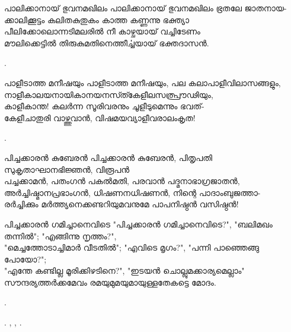 \begin{enumerate}


\begin{slokam}{\VMk}{\KV}{പാലിക്കാനായ് ഭുവനമഖിലം}
പാലിക്കാനായ് ഭുവനമഖിലം ഭ്രതലേ ജാതനായ-\\
ക്കാലിക്കൂട്ടം കലിതകുതുകം കാത്ത കണ്ണന്നു ഭക്ത്യാ\\
പീലിക്കോലൊന്നടിമലരിൽ നീ കാഴ്ചയായ് വച്ചിടേണം\\
മൗലിക്കെട്ടിൽ തിരുകുമതിനെത്തീൎച്ചയായ് ഭക്തദാസൻ.
\end{slokam}


.



\begin{slokam}{\VSv}{\KJ}{പാളീടാത്ത മനീഷയും}
പാളീടാത്ത മനീഷയും, പല കലാപാളീവിലാസങ്ങളും, \\
നാളീകാലയനായികാനയനസ്ത്കേളീലസത്പ്രൗഢിയും, \\
കാളീകാന്ത! കലർന്ന സൂരിവരനും ചൂളീടുമെന്നും ഭവത്- \\
കേളീചാതുരി വാഴ്ത്തുവാൻ, വിഷമയവ്യാളീവരാലംകൃത!
\end{slokam}


. 


\begin{slokam}{\VSr}{\OKM}{പിച്ചക്കാരൻ കുബേരൻ}
പിച്ചക്കാരൻ കുബേരൻ, പിതൃപതി സുകൃതാഘാനഭിജ്ഞൻ, വിരൂപൻ\\
പച്ചക്കാമൻ, പതംഗൻ പകൽമതി, പരവാൻ പദ്മനാഭാഗ്രജാതൻ,\\
അർച്ചിഷ്മാനപ്രഭാംഗൻ, ധിഷണനധിഷണൻ, നിന്റെ പാദാംബുജത്താ-\\
രർച്ചിക്കും മർത്ത്യനെക്കണ്ടറിയുമവനുമേ പാപനിഷ്ഠൻ വസിഷ്ഠൻ!
\end{slokam}



\begin{slokam}{\VSr}{\ARRV}{പിച്ചക്കാരൻ ഗമിച്ചാനെവിടെ}
"പിച്ചക്കാരൻ ഗമിച്ചാനെവിടെ?", "ബലിമഖം തന്നിൽ"; "എങ്ങിന്നു നൃത്തം?",\\
"മെച്ചത്തോടാച്ചിമാർ വീടതിൽ"; "എവിടെ മൃഗം?", "പന്നി പാഞ്ഞെങ്ങു പോയോ?";\\
"എന്തേ കണ്ടില്ല മൂരിക്കിഴടിനെ?", "ഇടയൻ ചൊല്ലുമക്കാര്യമെല്ലാം"\\
സൗന്ദര്യത്തർക്കമേവം രമയുമുമയുമായുള്ളതേകട്ടെ മോദം.
\end{slokam}


.

. , 
, .


\end{enumerate}
